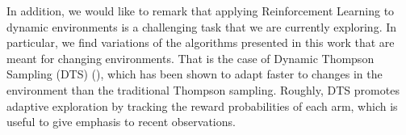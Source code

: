 \documentclass[a4paper,twoside,11pt]{reviewresponse}
\begin{document}
In addition, we would like to remark that applying Reinforcement Learning to dynamic environments is a challenging task that we are currently exploring. In particular, we find variations of the algorithms presented in this work that are meant for changing environments. That is the case of Dynamic Thompson Sampling (DTS) (\cite{gupta2011thompson}), which has been shown to adapt faster to changes in the environment than the traditional Thompson sampling. Roughly, DTS promotes adaptive exploration by tracking the reward probabilities of each arm, which is useful to give emphasis to recent observations.

\clearpage



\end{document}

